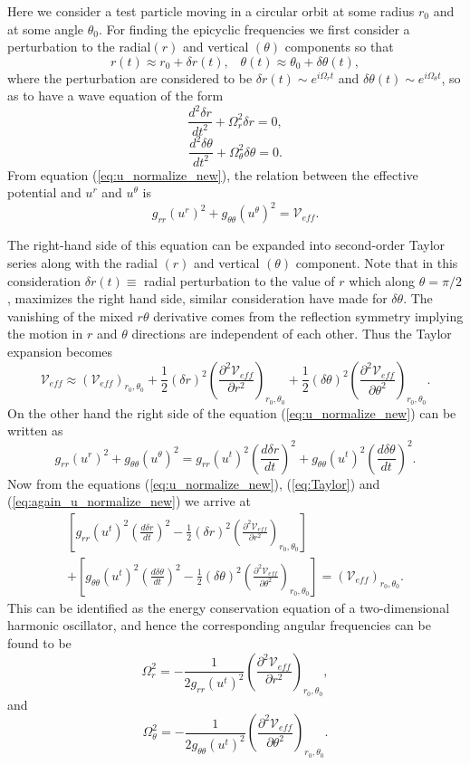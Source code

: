 \documentclass[12pt,a4paper,oneside]{book}
\newcommand{\eq}[2]{\begin{equation} \label{eq:#1} #2 \end{equation}}
\newcommand{\meq}[2]{\begin{multline}\label{eq:#1} #2 \end{multline}}
\newcommand{\Eref}[1]{(\ref{eq:#1})}
\begin{document}
Here we consider a test particle moving in a circular orbit at some radius $r_0$ and at some angle $\theta_0$. For finding the epicyclic frequencies we first consider a perturbation to the radial$ (r)$ and vertical $(\theta)$ 
components so that
\eq{}{r(t)\approx r_0+\delta r(t)\text{,}\quad\theta(t)\approx \theta_0+\delta\theta(t),}
where the perturbation are considered to be $\delta r(t)\sim e^{i\Omega_rt}$ and $\delta\theta(t) \sim e^{i\Omega_\theta t}$, so as to have a wave equation of the form
\eq{}{\frac{d^2\delta r}{dt^2} +\Omega_r^2\delta r = 0,}
\eq{}{\frac{d^2\delta \theta}{dt^2} + \Omega_\theta^2\delta\theta = 0.}
From equation \Eref{u_normalize_new}, the relation between the effective potential and $u^r$ and $u^\theta$ is
\[g_{rr}\left(u^r\right)^2+g_{\theta\theta}\left(u^\theta\right)^2 = \mathcal{V}_{eff}.\]

\noindent The right-hand side of this equation can be expanded into second-order Taylor series along with the radial $(r)$ and vertical $(\theta)$ component. Note that in this consideration $\delta r(t)\equiv$ radial perturbation to the value of $r$ which along $\theta = \pi/2$, maximizes the right hand side, similar consideration have made for $\delta \theta$. The vanishing of the mixed $r\theta$ derivative comes from the reflection symmetry implying the motion in $r$ and $\theta$ directions are independent of each other. Thus the Taylor expansion becomes
\eq{Taylor}{ \mathcal{V}_{eff}\approx  \left(\mathcal{V}_{eff}\right)_{r_0,\theta_0} + \frac{1}{2}\left(\delta r\right)^2\left(\frac{\partial^2\mathcal{V}_{eff}}{\partial r^2}\right)_{r_0,\theta_0} +  \frac{1}{2}\left(\delta\theta\right)^2\left(\frac{\partial^2\mathcal{V}_{eff}}{\partial \theta^2}\right)_{r_0,\theta_0}.}
On the other hand the right side of the equation \Eref{u_normalize_new} can be written as
\eq{again_u_normalize_new}{g_{rr}\left(u^r\right)^2+g_{\theta\theta}\left(u^\theta\right)^2 = g_{rr}\left(u^t\right)^2\left(\frac{d \delta r}{dt}\right)^2+g_{\theta\theta}\left(u^t\right)^2\left(\frac{d \delta \theta}{dt}\right)^2.}
Now from the equations \Eref{u_normalize_new}, \Eref{Taylor} and \Eref{again_u_normalize_new} we arrive at
\meq{2D_HO}{ \left[g_{rr}\left(u^t\right)^2\left(\frac{d \delta r}{dt}\right)^2 - \frac{1}{2}\left(\delta r\right)^2\left(\frac{\partial^2\mathcal{V}_{eff}}{\partial r^2}\right)_{r_0,\theta_0}\right] \\+\left[ g_{\theta\theta}\left(u^t\right)^2\left(\frac{d \delta \theta}{dt}\right)^2 - \frac{1}{2}\left(\delta\theta\right)^2\left(\frac{\partial^2\mathcal{V}_{eff}}{\partial \theta^2}\right)_{r_0,\theta_0}\right] = \left(\mathcal{V}_{eff}\right)_{r_0,\theta_0}. }
This can be identified as the energy conservation equation of a two-dimensional harmonic oscillator, and hence the corresponding angular frequencies can be found to be
\eq{nu_r_appendix}{\Omega_r^2 =- \frac{1}{2g_{rr}(u^t)^2}\left(\frac{\partial^2\mathcal{V}_{eff}}{\partial r^2}\right)_{r_0,\theta_0},}
and 
\eq{nu_theta_appendix}{\Omega_\theta^2 =- \frac{1}{2g_{\theta\theta}(u^t)^2}\left(\frac{\partial^2\mathcal{V}_{eff}}{\partial \theta^2}\right)_{r_0, \theta_0}.}

\printbibliography
\end{document}
